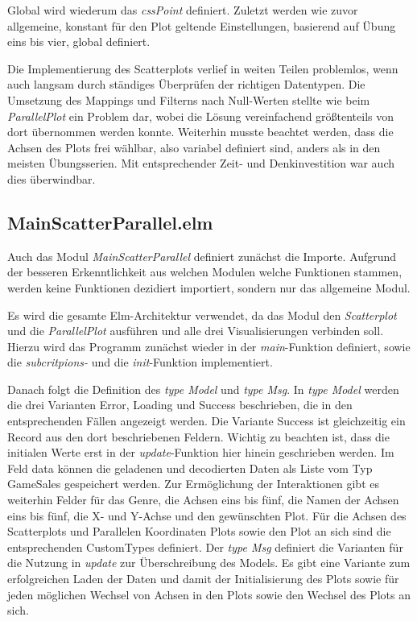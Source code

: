 \documentclass[usegeometry=true]{scrartcl}
\begin{document}
Global wird wiederum das \textit{cssPoint} definiert.
Zuletzt werden wie zuvor allgemeine, konstant für den Plot geltende Einstellungen, basierend auf Übung eins bis vier, global definiert. 

Die Implementierung des Scatterplots verlief in weiten Teilen problemlos, wenn auch langsam durch ständiges Überprüfen der richtigen Datentypen.
Die Umsetzung des Mappings und Filterns nach Null-Werten stellte wie beim \textit{ParallelPlot} ein Problem dar, wobei die Lösung vereinfachend größtenteils von dort übernommen werden konnte. 
Weiterhin musste beachtet werden, dass die Achsen des Plots frei wählbar, also variabel definiert sind, anders als in den meisten Übungsserien.
Mit entsprechender Zeit- und Denkinvestition war auch dies überwindbar.

\subsection{MainScatterParallel.elm}
Auch das Modul \textit{MainScatterParallel} definiert zunächst die Importe. 
Aufgrund der besseren Erkenntlichkeit aus welchen Modulen welche Funktionen stammen, werden keine Funktionen dezidiert importiert, sondern nur das allgemeine Modul. 

Es wird die gesamte Elm-Architektur verwendet, da das Modul den \textit{Scatterplot} und die \textit{ParallelPlot} ausführen und alle drei Visualisierungen verbinden soll.
Hierzu wird das Programm zunächst wieder in der \textit{main}-Funktion definiert, sowie die \textit{subcritpions-} und die \textit{init}-Funktion implementiert.

Danach folgt die Definition des \textit{type Model} und \textit{type Msg}. 
In \textit{type Model} werden die drei Varianten Error, Loading und Success beschrieben, die in den entsprechenden Fällen angezeigt werden. 
Die Variante Success ist gleichzeitig ein Record aus den dort beschriebenen Feldern. 
Wichtig zu beachten ist, dass die initialen Werte erst in der \textit{update}-Funktion hier hinein geschrieben werden.
Im Feld data können die geladenen und decodierten Daten als Liste vom Typ GameSales gespeichert werden. 
Zur Ermöglichung der Interaktionen gibt es weiterhin Felder für das Genre, die Achsen eins bis fünf, die Namen der Achsen eins bis fünf, die X- und Y-Achse und den gewünschten Plot. 
Für die Achsen des Scatterplots und Parallelen Koordinaten Plots sowie den Plot an sich sind die entsprechenden CustomTypes definiert.
Der \textit{type Msg} definiert die Varianten für die Nutzung in \textit{update} zur Überschreibung des Models. 
Es gibt eine Variante zum erfolgreichen Laden der Daten und damit der Initialisierung des Plots sowie für jeden möglichen Wechsel von Achsen in den Plots sowie den Wechsel des Plots an sich.
\end{document}

